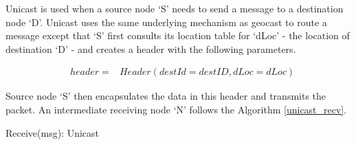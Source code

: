 Unicast is used when a source node `S' needs to send a message to a destination node `D'. Unicast uses the same underlying mechanism as geocast to route a message except that `S' first consults its location table for `dLoc' - the location of destination `D' - and creates a header with the following parameters.

\begin{eqnarray*}
& header = & Header(destId = destID, dLoc = dLoc)
\end{eqnarray*}

Source node `S' then encapsulates the data in this header and transmits the packet.
An intermediate receiving node `N' follows the Algorithm \ref{unicast_recv}.

\begin{algorithm}
\caption{Receive(msg): Unicast} 
\label{unicast_recv}
\DontPrintSemicolon
{}
\end{algorithm}
